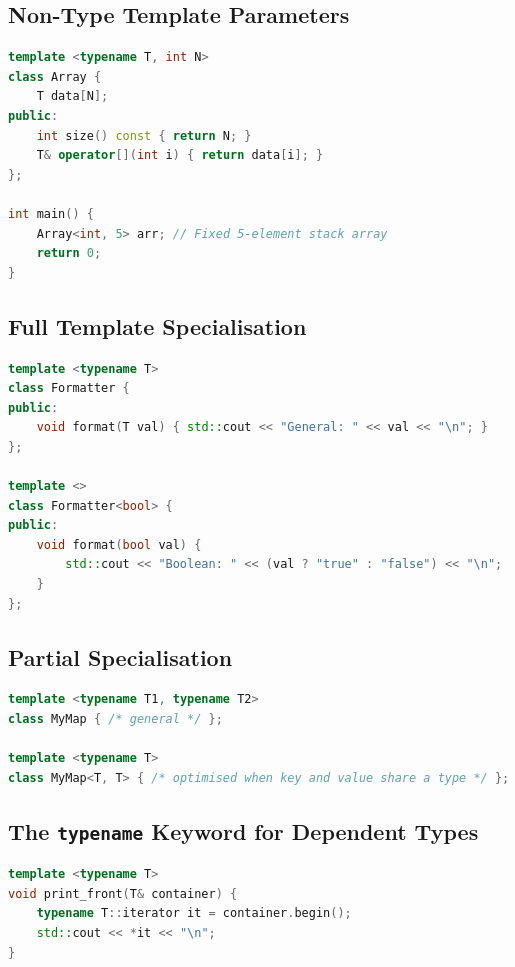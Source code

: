 \subsection{Non-Type Template Parameters}

\begin{lstlisting}[language=C++, caption={Non-type template parameter for compile-time size}]
template <typename T, int N>
class Array {
    T data[N];
public:
    int size() const { return N; }
    T& operator[](int i) { return data[i]; }
};

int main() {
    Array<int, 5> arr; // Fixed 5-element stack array
    return 0;
}
\end{lstlisting}

\subsection{Full Template Specialisation}

\begin{lstlisting}[language=C++, caption={Full template specialisation for bool}]
template <typename T>
class Formatter {
public:
    void format(T val) { std::cout << "General: " << val << "\n"; }
};

template <>
class Formatter<bool> {
public:
    void format(bool val) {
        std::cout << "Boolean: " << (val ? "true" : "false") << "\n";
    }
};
\end{lstlisting}

\subsection{Partial Specialisation}

\begin{lstlisting}[language=C++, caption={Partial specialisation for same-typed parameters}]
template <typename T1, typename T2>
class MyMap { /* general */ };

template <typename T>
class MyMap<T, T> { /* optimised when key and value share a type */ };
\end{lstlisting}

\subsection{The \texttt{typename} Keyword for Dependent Types}

\begin{lstlisting}[language=C++, caption={typename disambiguates dependent type names}]
template <typename T>
void print_front(T& container) {
    typename T::iterator it = container.begin();
    std::cout << *it << "\n";
}
\end{lstlisting}

